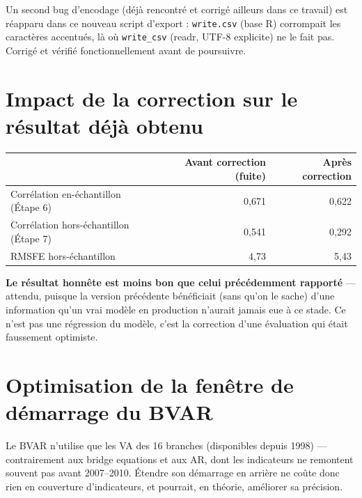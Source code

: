 \documentclass[11pt,a4paper]{article}
\begin{document}
\begin{alertebox}
Un second bug d'encodage (déjà rencontré et corrigé ailleurs dans ce travail) est réapparu dans ce nouveau script d'export : \texttt{write.csv} (base R) corrompait les caractères accentués, là où \texttt{write\_csv} (readr, UTF-8 explicite) ne le fait pas. Corrigé et vérifié fonctionnellement avant de poursuivre.
\end{alertebox}

\section{Impact de la correction sur le résultat déjà obtenu}

\begin{center}
\begin{tabular}{lrr}
\toprule
& \textbf{Avant correction (fuite)} & \textbf{Après correction} \\
\midrule
Corrélation en-échantillon (Étape 6) & 0,671 & 0,622 \\
Corrélation hors-échantillon (Étape 7) & 0,541 & 0,292 \\
RMSFE hors-échantillon & 4,73 & 5,43 \\
\bottomrule
\end{tabular}
\end{center}

\begin{alertebox}
\textbf{Le résultat honnête est moins bon que celui précédemment rapporté} --- attendu, puisque la version précédente bénéficiait (sans qu'on le sache) d'une information qu'un vrai modèle en production n'aurait jamais eue à ce stade. Ce n'est pas une régression du modèle, c'est la correction d'une évaluation qui était faussement optimiste.
\end{alertebox}

\section{Optimisation de la fenêtre de démarrage du BVAR}

\begin{intuition}
Le BVAR n'utilise que les VA des 16 branches (disponibles depuis 1998) --- contrairement aux bridge equations et aux AR, dont les indicateurs ne remontent souvent pas avant 2007--2010. Étendre son démarrage en arrière ne coûte donc rien en couverture d'indicateurs, et pourrait, en théorie, améliorer sa précision.
\end{intuition}
\end{document}
